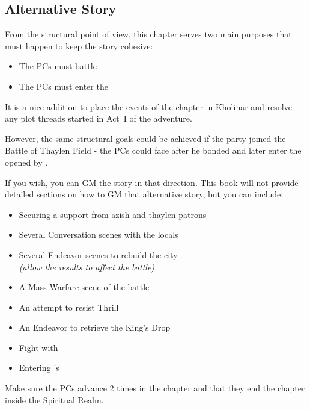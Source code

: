 \subsection{Alternative Story}
\label{ssec:alternativeStoryChap9}

From the structural point of view, this chapter serves two main purposes that must happen to keep the story cohesive:
\begin{itemize}
	\item The PCs must battle \npcYeligNar{}
	\item The PCs must enter the \locationPerpendicularity{}
\end{itemize}

It is a nice addition to place the events of the chapter in Kholinar and resolve any plot threads started in Act~I of the adventure. 

However, the same structural goals could be achieved if the party joined the Battle of Thaylen Field - the PCs could face \npcAmaram{} after he bonded \npcYeligNar{} and later enter the \locationPerpendicularity{} opened by \npcDalinar{}. 

If you wish, you can GM the story in that direction. This book will not provide detailed sections on how to GM that alternative story, but you can include:

\begin{itemize}
	\item Securing a support from azish and thaylen patrons
	\item Several Conversation scenes with the locals
	\item Several Endeavor scenes to rebuild the city \\ \textit{(allow the results to affect the battle)}
	\item A Mass Warfare scene of the battle
	\item An attempt to resist Thrill
	\item An Endeavor to retrieve the King's Drop
	\item Fight with \npcYeligNar{}
	\item Entering \npcDalinar{}'s \locationPerpendicularity{}
\end{itemize}

Make sure the PCs advance 2 times in the chapter and that they end the chapter inside the Spiritual Realm.






\newpage

\newpage

\newpage

\newpage

\newpage

